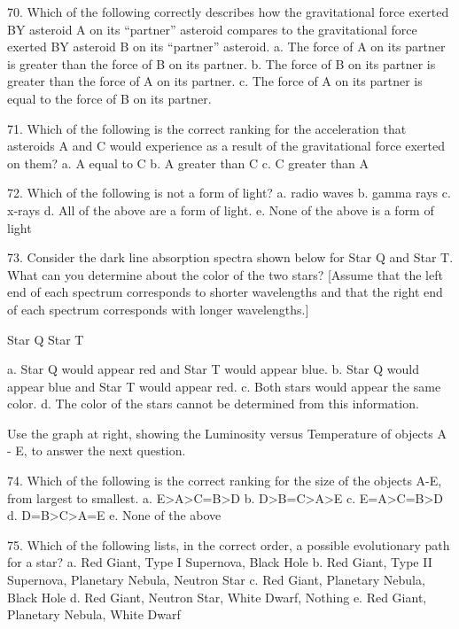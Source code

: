 70. Which of the following correctly describes how the gravitational force exerted BY asteroid A on its “partner” asteroid compares to the gravitational force exerted BY asteroid B on its “partner” asteroid.
a. The force of A on its partner is greater than the force of B on its partner.
b. The force of B on its partner is greater than the force of A on its partner.
c. The force of A on its partner is equal to the force of B on its partner.


71. Which of the following is the correct ranking for the acceleration that asteroids A and C would experience as a result of the gravitational force exerted on them? 
a. A equal to C
b. A greater than C
c. C greater than A 



72. Which of the following is not a form of light?
a.  radio waves
b.  gamma rays
c.  x-rays
d.  All of the above are a form of light.
e.  None of the above is a form of light



73. Consider the dark line absorption spectra shown below for Star Q and Star T. What can you determine about the color of the two stars? [Assume that the left end of each spectrum corresponds to shorter wavelengths and that the right end of each spectrum corresponds with longer wavelengths.]



Star Q                          Star T

a. Star Q would appear red and Star T would appear blue. 
b. Star Q would appear blue and Star T would appear red.
c. Both stars would appear the same color.
d. The color of the stars cannot be determined from this information.





Use the graph at right, showing the Luminosity versus Temperature of objects A - E, to answer the next question.


74. Which of the following is the correct ranking for the size of the objects A-E, from largest to smallest.
a. E>A>C=B>D
b. D>B=C>A>E
c. E=A>C=B>D
d. D=B>C>A=E
e. None of the above 




75. Which of the following lists, in the correct order, a possible evolutionary path for a star?
a. Red Giant, Type I Supernova, Black Hole
b. Red Giant, Type II Supernova, Planetary Nebula, Neutron Star
c. Red Giant, Planetary Nebula, Black Hole 
d. Red Giant, Neutron Star, White Dwarf, Nothing
e. Red Giant, Planetary Nebula, White Dwarf


\endinput



